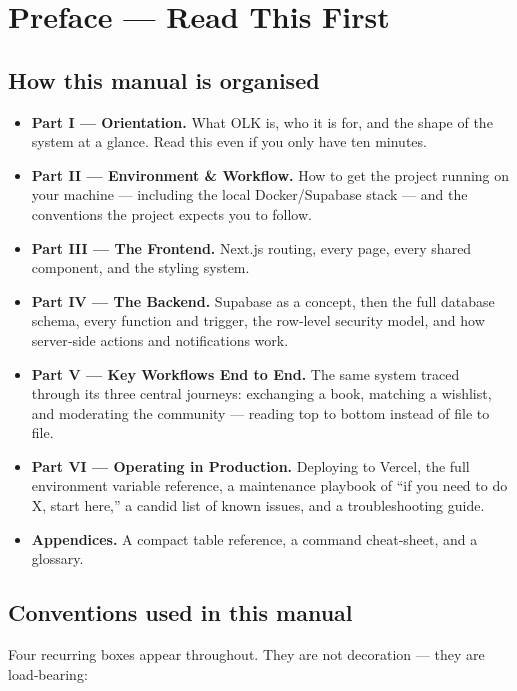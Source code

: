 \chapter*{Preface — Read This First}

\section*{How this manual is organised}

\begin{itemize}
	\item \textbf{Part I — Orientation.} What OLK is, who it is for, and the shape of the system at a glance. Read this even if you only have ten minutes.
	\item \textbf{Part II — Environment \& Workflow.} How to get the project running on your machine — including the local Docker/Supabase stack — and the conventions the project expects you to follow.
	\item \textbf{Part III — The Frontend.} Next.js routing, every page, every shared component, and the styling system.
	\item \textbf{Part IV — The Backend.} Supabase as a concept, then the full database schema, every function and trigger, the row‑level security model, and how server‑side actions and notifications work.
	\item \textbf{Part V — Key Workflows End to End.} The same system traced through its three central journeys: exchanging a book, matching a wishlist, and moderating the community — reading top to bottom instead of file to file.
	\item \textbf{Part VI — Operating in Production.} Deploying to Vercel, the full environment variable reference, a maintenance playbook of “if you need to do X, start here,” a candid list of known issues, and a troubleshooting guide.
	\item \textbf{Appendices.} A compact table reference, a command cheat‑sheet, and a glossary.
\end{itemize}

\section*{Conventions used in this manual}

Four recurring boxes appear throughout. They are not decoration — they are load‑bearing:

